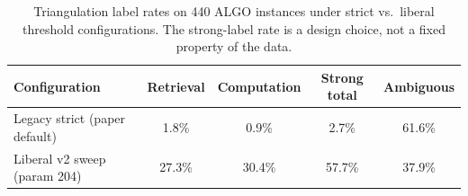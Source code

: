 \begin{table}[t]
  \centering
  \small
  \caption{Triangulation label rates on 440 ALGO instances under strict vs.\
  liberal threshold configurations. The strong-label rate is a design choice,
  not a fixed property of the data.}
  \label{tab:thresholds}
  \begin{tabular}{lcccc}
    \toprule
    Configuration & Retrieval & Computation & Strong total & Ambiguous \\
    \midrule
    Legacy strict (paper default) & 1.8\%  & 0.9\%  & 2.7\%  & 61.6\% \\
    Liberal v2 sweep (param 204)  & 27.3\% & 30.4\% & 57.7\% & 37.9\% \\
    \bottomrule
  \end{tabular}
\end{table}
